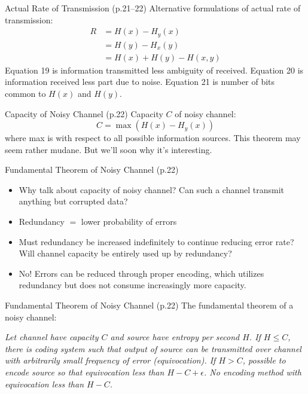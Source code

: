 \documentclass{beamer}
\begin{document}
  \begin{frame}{Actual Rate of Transmission \small (p.21--22)}
    Alternative formulations of actual rate of transmission:
    \begin{align}
      R &= H(x) - H_y(x) \\
        &= H(y) - H_x(y) \\
        &= H(x) + H(y) - H(x,y)
    \end{align}
    Equation 19 is information transmitted less ambiguity of received.
    Equation 20 is information received less part due to noise.  Equation 21 is
    number of bits common to $H(x)$ and $H(y)$.
  \end{frame}

  \begin{frame}{Capacity of Noisy Channel \small (p.22)}
    Capacity $C$ of noisy channel:
    \begin{equation}
      C = \max(H(x) - H_y(x))
    \end{equation}
    where max is with respect to all possible information sources.  This
    theorem may seem rather mudane.  But we'll soon why it's interesting.
  \end{frame}

  \begin{frame}{Fundamental Theorem of Noisy Channel \small (p.22)}
    \begin{itemize}
      \item Why talk about capacity of noisy channel?  Can such a channel
        transmit anything but corrupted data?
      \item Redundancy $=$ lower probability of errors
      \item Must redundancy be increased indefinitely to continue reducing
        error rate?  Will channel capacity be entirely used up by redundancy?
      \item No!  Errors can be reduced through proper encoding, which utilizes
        redundancy but does not consume increasingly more capacity.
    \end{itemize}
  \end{frame}

  \begin{frame}{Fundamental Theorem of Noisy Channel \small (p.22)}
    The fundamental theorem of a noisy channel:

    \textit{Let channel have capacity $C$ and source have entropy per second
    $H$.  If $H \le C$, there is coding system such that output of source can
    be transmitted over channel with arbitrarily small frequency of error
    (equivocation).  If $H > C$, possible to encode source so that equivocation
    less than $H - C + \epsilon$.  No encoding method with equivocation less
    than $H - C$.}
  \end{frame}
\end{document}
